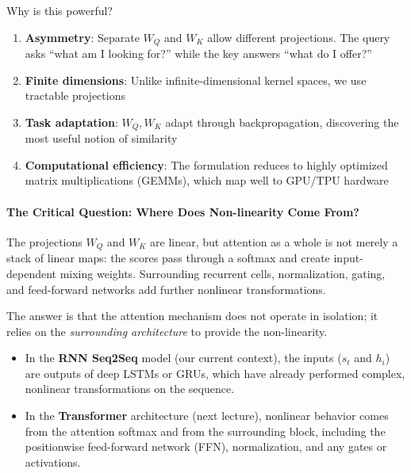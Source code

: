 \documentclass{article}
\begin{document}
Why is this powerful?
\begin{enumerate}
    \item \textbf{Asymmetry}: Separate $W_Q$ and $W_K$ allow different projections. The query asks ``what am I looking for?'' while the key answers ``what do I offer?''
    \item \textbf{Finite dimensions}: Unlike infinite-dimensional kernel spaces, we use tractable projections
    \item \textbf{Task adaptation}: $W_Q, W_K$ adapt through backpropagation, discovering the most useful notion of similarity
    \item \textbf{Computational efficiency}: The formulation reduces to highly optimized matrix multiplications (GEMMs), which map well to GPU/TPU hardware
\end{enumerate}

\paragraph{The Critical Question: Where Does Non-linearity Come From?}

The projections $W_Q$ and $W_K$ are linear, but attention as a whole is not merely a
stack of linear maps: the scores pass through a softmax and create input-dependent
mixing weights. Surrounding recurrent cells, normalization, gating, and feed-forward
networks add further nonlinear transformations.

The answer is that the attention mechanism does not operate in isolation; it relies on the \textit{surrounding architecture} to provide the non-linearity.

\begin{itemize}
    \item In the \textbf{RNN Seq2Seq} model (our current context), the inputs ($s_t$ and $h_i$) are outputs of deep LSTMs or GRUs, which have already performed complex, nonlinear transformations on the sequence.
    \item In the \textbf{Transformer} architecture (next lecture), nonlinear behavior
    comes from the attention softmax and from the surrounding block, including the
    positionwise feed-forward network (FFN), normalization, and any gates or activations.
\end{itemize}
\end{document}
